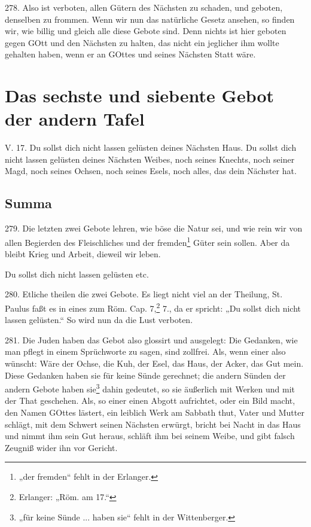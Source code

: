278. Also ist verboten, allen Gütern des Nächsten zu schaden, und geboten, denselben zu frommen. Wenn wir nun das natürliche Gesetz ansehen, so finden wir, wie billig und gleich alle diese Gebote sind. Denn nichts ist hier geboten gegen GOtt und den Nächsten zu halten, das nicht ein jeglicher ihm wollte gehalten haben, wenn er an GOttes und seines Nächsten Statt wäre.

\section{Das sechste und siebente Gebot der andern Tafel}

\begin{schriftzitat}
V. 17. Du sollst dich nicht lassen gelüsten deines Nächsten Haus. Du sollst dich nicht lassen gelüsten deines Nächsten Weibes, noch seines Knechts, noch seiner Magd, noch seines Ochsen, noch seines Esels, noch alles, das dein Nächster hat.
\end{schriftzitat}

\subsection{Summa}

279. Die letzten zwei Gebote lehren, wie böse die Natur sei, und wie rein wir von allen Begierden des Fleischliches und der fremden\footnote{„der fremden“ fehlt in der Erlanger.} Güter sein sollen. Aber da bleibt Krieg und Arbeit, dieweil wir leben.

\begin{schriftzitat}
Du sollst dich nicht lassen gelüsten etc.
\end{schriftzitat}

280. Etliche theilen die zwei Gebote. Es liegt nicht viel an der Theilung, St. Paulus faßt es in eines zum Röm. Cap. 7,\footnote{Erlanger: „Röm. am 17.“} 7., da er spricht: „Du sollst dich nicht lassen gelüsten.“ So wird nun da die Lust verboten.

281. Die Juden haben das Gebot also glossirt und ausgelegt: Die Gedanken, wie man pflegt
in einem Sprüchworte zu sagen, sind zollfrei. Als, wenn einer also wünscht: Wäre der Ochse, die Kuh, der Esel, das Haus, der Acker, das Gut mein. Diese Gedanken haben sie für keine Sünde gerechnet; die andern Sünden der andern Gebote haben sie\footnote{„für keine Sünde ... haben sie“ fehlt in der Wittenberger.} dahin gedeutet, so sie äußerlich mit Werken und mit der That geschehen. Als, so einer einen Abgott aufrichtet, oder ein Bild macht, den Namen GOttes lästert, ein leiblich Werk am Sabbath thut, Vater und Mutter schlägt, mit dem Schwert seinen Nächsten erwürgt, bricht bei Nacht in das Haus und nimmt ihm sein Gut heraus, schläft ihm bei seinem Weibe, und gibt falsch Zeugniß wider ihn vor Gericht.

